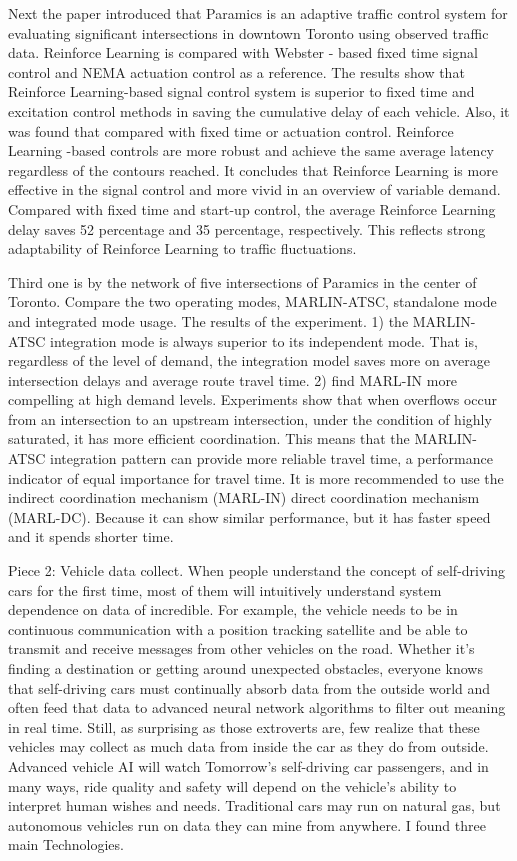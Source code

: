 \documentclass[letterpaper,10pt,draftclsnofoot,onecolumn]{IEEEtran}
\begin{document}
Next the paper introduced that Paramics is an adaptive traffic control system for evaluating significant intersections in downtown Toronto using observed traffic data. Reinforce Learning is compared with Webster - based fixed time signal control and NEMA actuation control as a reference. The results show that Reinforce Learning-based signal control system is superior to fixed time and excitation control methods in saving the cumulative delay of each vehicle. Also, it was found that compared with fixed time or actuation control. Reinforce Learning -based controls are more robust and achieve the same average latency regardless of the contours reached. It concludes that Reinforce Learning is more effective in the signal control and more vivid in an overview of variable demand. Compared with fixed time and start-up control, the average Reinforce Learning delay saves 52 percentage and 35 percentage, respectively. This reflects strong adaptability of Reinforce Learning to traffic fluctuations.

Third one is by the network of five intersections of Paramics in the center of Toronto. Compare the two operating modes, MARLIN-ATSC, standalone mode and integrated mode usage. The results of the experiment. 1) the MARLIN-ATSC integration mode is always superior to its independent mode. That is, regardless of the level of demand, the integration model saves more on average intersection delays and average route travel time. 2) find MARL-IN more compelling at high demand levels. Experiments show that when overflows occur from an intersection to an upstream intersection, under the condition of highly saturated, it has more efficient coordination. This means that the MARLIN-ATSC integration pattern can provide more reliable travel time, a performance indicator of equal importance for travel time. It is more recommended to use the indirect coordination mechanism (MARL-IN) direct coordination mechanism (MARL-DC). Because it can show similar performance, but it has faster speed and it spends shorter time.
                

Piece 2: Vehicle data collect. When people understand the concept of self-driving cars for the first time, most of them will intuitively understand system dependence on data of incredible. For example, the vehicle needs to be in continuous communication with a position tracking satellite and be able to transmit and receive messages from other vehicles on the road. Whether it's finding a destination or getting around unexpected obstacles, everyone knows that self-driving cars must continually absorb data from the outside world and often feed that data to advanced neural network algorithms to filter out meaning in real time. Still, as surprising as those extroverts are, few realize that these vehicles may collect as much data from inside the car as they do from outside. Advanced vehicle AI will watch Tomorrow's self-driving car passengers, and in many ways, ride quality and safety will depend on the vehicle's ability to interpret human wishes and needs. Traditional cars may run on natural gas, but autonomous vehicles run on data they can mine from anywhere. I found three main Technologies.
    
\end{document}
